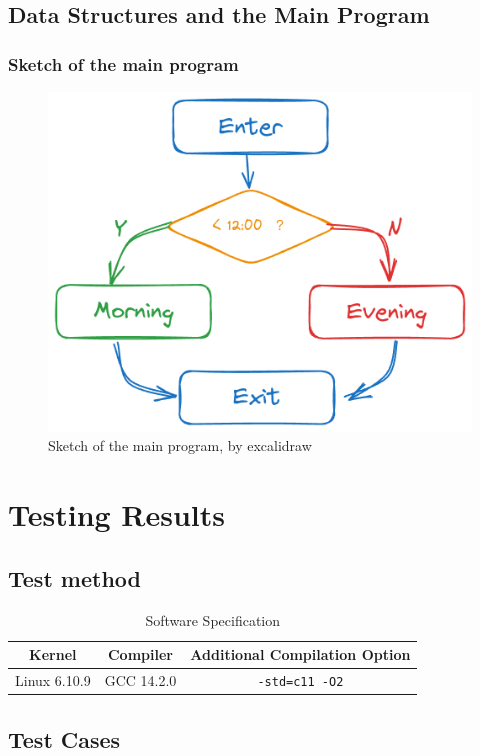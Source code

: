 \documentclass[10pt, twoside]{article}
\begin{document}
\subsection{Data Structures and the Main Program}

\lipsum[8][1-7]

\subsubsection{Sketch of the main program}

\begin{figure}[!ht]
    \centering
    \includegraphics[width=0.4\linewidth]{assets/sketch.png}
    \caption{Sketch of the main program, by excalidraw}
\end{figure}

\section{Testing Results}

\subsection{Test method}

\lipsum[10-11]

\begin{table}[!ht]
    \centering
    \caption{Software Specification}
    \begin{tabular}{ccc}
        \toprule
        \textbf{Kernel} & \textbf{Compiler} & \textbf{Additional Compilation Option} \\
        \midrule
        Linux 6.10.9    & GCC 14.2.0        & \verb|-std=c11 -O2|                    \\
        \bottomrule
    \end{tabular}
\end{table}

\subsection{Test Cases}
\end{document}
